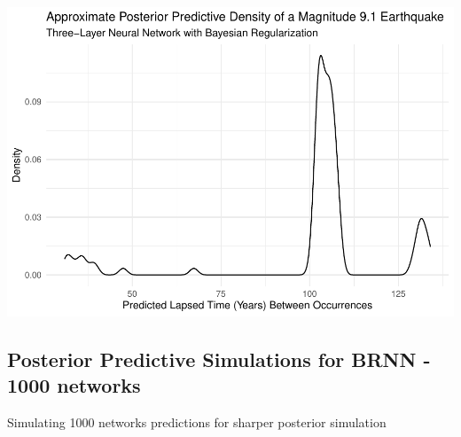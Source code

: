 \begin{Shaded}
\begin{Highlighting}[]
\NormalTok{(} \SpecialCharTok{/}\SpecialCharTok{\^{}}\SpecialCharTok{+}
\NormalTok{() }\SpecialCharTok{+} 
    \NormalTok{(} \NormalTok{,}
          \NormalTok{,}
          \NormalTok{,}
          \NormalTok{) }\SpecialCharTok{+}
  \NormalTok{()}
\end{Highlighting}
\end{Shaded}

\includegraphics{earthquakes_files/figure-latex/unnamed-chunk-14-2.pdf}

\hypertarget{posterior-predictive-simulations-for-brnn---1000-networks}{%
\subsection{Posterior Predictive Simulations for BRNN - 1000
networks}\label{posterior-predictive-simulations-for-brnn---1000-networks}}

Simulating 1000 networks predictions for sharper posterior simulation


